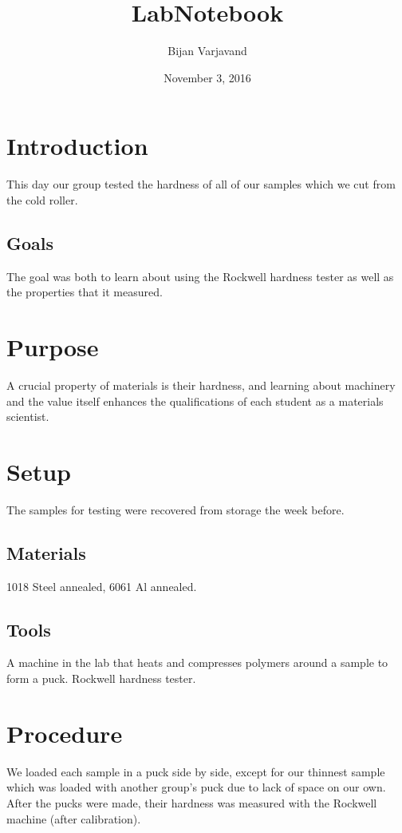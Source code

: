 \documentclass{article}
\author{Bijan Varjavand}
\title{LabNotebook}
\date{November 3, 2016}
\begin{document}
\maketitle

\section{Introduction}

This day our group tested the hardness of all of our samples which we cut from the cold roller.
\subsection{Goals}

The goal was both to learn about using the Rockwell hardness tester as well as the properties that it measured.
\section{Purpose}

A crucial property of materials is their hardness, and learning about machinery and the value itself enhances the qualifications of each student as a materials scientist.
\section{Setup}

The samples for testing were recovered from storage the week before.
\subsection{Materials}

1018 Steel annealed, 6061 Al annealed.
\subsection{Tools}

A machine in the lab that heats and compresses polymers around a sample to form a puck. Rockwell hardness tester.
\section{Procedure}

We loaded each sample in a puck side by side, except for our thinnest sample which was loaded with another group's puck due to lack of space on our own. After the pucks were made, their hardness was measured with the Rockwell machine (after calibration).
\end{document}
